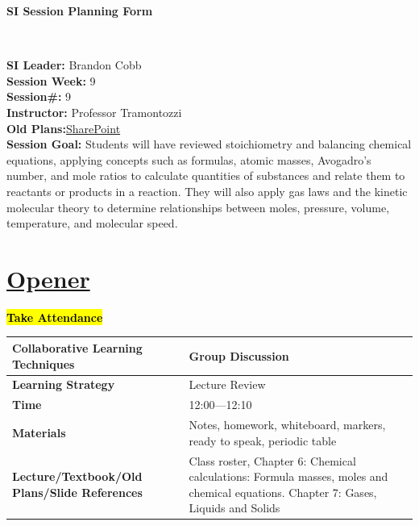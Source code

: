 \documentclass{article}
\begin{document}
\begin{center}
    {\LARGE\textbf{SI Session Planning Form}}
\end{center}

\
\noindent
\begin{flushleft}
\textbf{SI Leader:} Brandon Cobb\\
\textbf{Session Week:} 9\\
\textbf{Session\#:} 9\\
\textbf{Instructor:} Professor Tramontozzi\\
\textbf{Old Plans:}\href{https://macombedu.sharepoint.com/:b:/s/ASC-SupplementalInstructionEmbeddedTutoring/EeSYqCwT_KhMolgJvXbVEjgBOyF_DevvS8BgCm1zPkQQJg?e=QJTt4o}{SharePoint}\\
\textbf{Session Goal:} Students will have reviewed stoichiometry and balancing chemical equations, applying concepts such as formulas, atomic masses, Avogadro’s number, and mole ratios to calculate quantities of substances and relate them to reactants or products in a reaction. They will also apply gas laws and the kinetic molecular theory to determine relationships between moles, pressure, volume, temperature, and molecular speed.
\end{flushleft}

\vspace{1em}
\section*{\underline{Opener}}
{\centering\large\textbf{\hl{Take Attendance}}\par}\vspace{-0.25\baselineskip}
\noindent
\begin{tabular}{|p{4.2cm}|p{9.8cm}|}
\hline
\textbf{Collaborative Learning Techniques} & Group Discussion\\
\hline
\textbf{Learning Strategy} & Lecture Review\\
\hline
\textbf{Time} & 12:00---12:10\\
\hline
\textbf{Materials} & Notes, homework, whiteboard, markers, ready to speak, periodic table \\
\hline
\textbf{Lecture/Textbook/Old Plans/Slide References} & Class roster, Chapter 6: Chemical calculations: Formula masses, moles and chemical equations. Chapter 7: Gases, Liquids and Solids \\
\hline
\end{tabular}
\end{document}
